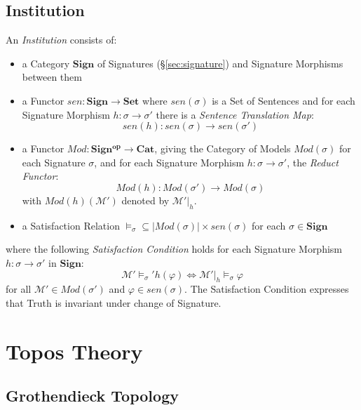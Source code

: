 \subsection{Institution}\label{sec:institution}

An \emph{Institution} consists of:

\begin{itemize}
\item a Category $\mathbf{Sign}$ of Signatures (\S\ref{sec:signature})
  and Signature Morphisms between them
\item a Functor $sen : \mathbf{Sign} \rightarrow \mathbf{Set}$ where
  $sen(\sigma)$ is a Set of Sentences and for each Signature Morphism
  $h : \sigma \rightarrow \sigma'$ there is a \emph{Sentence
  Translation Map}:
  \[
  sen(h) : sen(\sigma) \rightarrow sen(\sigma')
  \]
\item a Functor $Mod : \mathbf{Sign^{op}} \rightarrow \mathbf{Cat}$,
  giving the Category of Models $Mod (\sigma)$ for each Signature
  $\sigma$, and for each Signature Morphism $h : \sigma \rightarrow
  \sigma'$, the \emph{Reduct Functor}:
  \[
  Mod(h) : Mod(\sigma') \rightarrow Mod(\sigma)
  \]
  with $Mod(h)(\mathcal{M}')$ denoted by $\mathcal{M}'|_h$.
\item a Satisfaction Relation $\models_\sigma \subseteq |Mod(\sigma)|
  \times sen(\sigma)$ for each $\sigma \in \mathbf{Sign}$
\end{itemize}
where the following \emph{Satisfaction Condition} holds for each
Signature Morphism $h : \sigma \rightarrow \sigma'$ in
$\mathbf{Sign}$:
\[
  \mathcal{M}' \models_\sigma' h(\varphi) \Leftrightarrow
  \mathcal{M}'|_h \models_\sigma \varphi
\]
for all $\mathcal{M}' \in Mod(\sigma')$ and $\varphi \in sen(\sigma)$.
The Satisfaction Condition expresses that Truth is invariant under
change of Signature.



\section{Topos Theory}\label{sec:topos_theory}

\subsection{Grothendieck Topology}\label{sec:grothendieck_topology}

